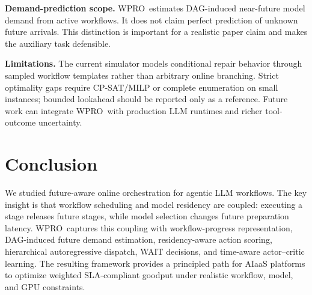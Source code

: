 \documentclass[10pt,conference]{IEEEtran}
\newcommand{\WPRO}{\textsc{WPRO}}
\begin{document}
\textbf{Demand-prediction scope.}
\WPRO\ estimates DAG-induced near-future model demand from active workflows. It does not claim perfect prediction of unknown future arrivals. This distinction is important for a realistic paper claim and makes the auxiliary task defensible.

\textbf{Limitations.}
The current simulator models conditional repair behavior through sampled workflow templates rather than arbitrary online branching. Strict optimality gaps require CP-SAT/MILP or complete enumeration on small instances; bounded lookahead should be reported only as a reference. Future work can integrate \WPRO\ with production LLM runtimes and richer tool-outcome uncertainty.

\section{Conclusion}

We studied future-aware online orchestration for agentic LLM workflows. The key insight is that workflow scheduling and model residency are coupled: executing a stage releases future stages, while model selection changes future preparation latency. \WPRO\ captures this coupling with workflow-progress representation, DAG-induced future demand estimation, residency-aware action scoring, hierarchical autoregressive dispatch, WAIT decisions, and time-aware actor--critic learning. The resulting framework provides a principled path for AIaaS platforms to optimize weighted SLA-compliant goodput under realistic workflow, model, and GPU constraints.



\end{document}
